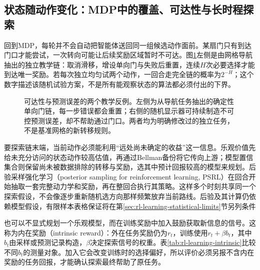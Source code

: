 \subsection{状态随动作变化：MDP中的覆盖、可达性与长时程探索}
\label{sec:rl-learning-deep-exploration}

回到MDP，每轮并不会自动把智能体送回同一组候选动作面前。某扇门只有到达门口才能尝试，一次转向可能让后续奖励区域暂时不可达。图\ref{fig:rl-learning-exploration-chain}左侧是由网格导航抽出的独立教学链：取消滑移，增设单向门与失败后重置，连续$H$次必要选择才能到达唯一奖励。若每次独立均匀试两个动作，一回合走完全链的概率为$2^{-H}$；这个数字描述该随机试验方案，不是所有能观察状态的算法都必须付出的下界。

\begin{figure}[t]
  \centering
  
  \caption{可达性与预测误差的两个教学反例。左侧为从导航任务抽出的确定性单向门链，每一步错误都会重置；右侧的随机显示器可持续制造不可控预测误差，却不帮助通过门口。两者均为明确修改过的独立任务，不是基准网格的新转移规则。}
  \label{fig:rl-learning-exploration-chain}
\end{figure}

要探索链末端，当前动作必须能利用“远处尚未确定的收益”这一信息。乐观价值先给未充分访问的状态动作较高估值，再通过Bellman备份将它传向上游；模型置信集合则保留尚未被数据排除的转移与奖励，选其中预计回报较高的模型来规划。后验采样强化学习（posterior sampling for reinforcement learning, PSRL）在回合开始抽取一套完整动力学和奖励，再在整回合执行其策略。这样多个时刻共享同一个探索假设，不会像逐步重新随机选方向那样频繁放弃当前路线。后验及其计算仍依赖模型假设，有限样本表格保证将在第\ref{sec:rl-learning-statistical-limits}节另列条件

也可以不显式规划一个乐观模型，而在训练奖励中加入鼓励获取新信息的信号。这称为内在奖励（intrinsic reward）：外在任务奖励仍为$r_t$，训练使用$r_t+\beta b_t$，其中$b_t$由采样或预测记录构造，$\beta$决定探索信号的权重。表\ref{tab:rl-learning-intrinsic}比较不同$b_t$的测量对象。加入它会改变训练时的选择偏好，所以评价必须另报不含内在奖励的任务回报，才能确认探索最终帮助了原任务。

